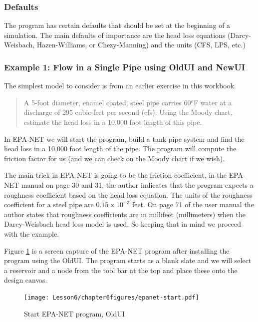 \subsubsection{Defaults}
The program has certain defaults that should be set at the beginning of a simulation.  
The main defaults of importance are the head loss equations (Darcy-Weisbach, Hazen-Williams, or Chezy-Manning) and the units (CFS, LPS, etc.)   

\subsubsection{Example 1: Flow in a Single Pipe using OldUI and NewUI}
The simplest model to consider is from an earlier exercise in this workbook.

\begin{quote}A 5-foot diameter, enamel coated, steel pipe carries 60$^o$F water at a discharge of 295 cubic-feet per second (cfs).  Using the Moody chart, estimate the head loss in a 10,000 foot length of this pipe.
\end{quote}

In EPA-NET we will start the program, build a tank-pipe system and find the head loss in a 10,000 foot length of the pipe.  The program will compute the friction factor for us (and we can check on the Moody chart if we wish).  

The main trick in EPA-NET is going to be the friction coefficient, in the EPA-NET manual on page 30 and 31, the author indicates that the program expects a roughness coefficient based on the head loss equation.  The units of the roughness coefficient for a steel pipe are $0.15 \times 10^{-3}$ feet.   On page 71 of the user manual the author states that roughness coefficients are in millifeet (millimeters) when the Darcy-Weisbach head loss model is used.   So keeping that in mind we proceed with the example.

Figure \ref{fig:epanet-start} is a screen capture of the EPA-NET program after installing the program using the OldUI.   The program starts as a blank slate and we will select a reservoir and a node from the tool bar at the top and place these onto the design canvas.
\begin{figure}[h!] %
   \centering
   \texttt{[image: Lesson6/chapter6figures/epanet-start.pdf]} 
   \caption{Start EPA-NET program, OldUI}
   \label{fig:epanet-start}
\end{figure}

